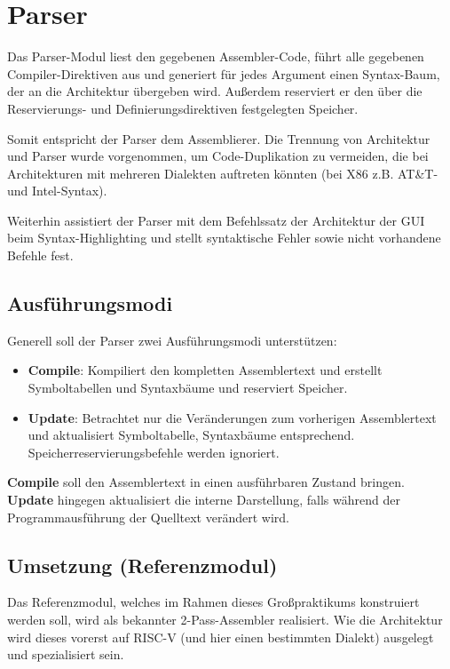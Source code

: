 \chapter{Parser}

Das Parser-Modul liest den gegebenen Assembler-Code, führt alle gegebenen
Compiler-Direktiven aus und generiert für jedes Argument einen Syntax-Baum, der
an die Architektur übergeben wird.  Außerdem reserviert er den über die
Reservierungs- und Definierungsdirektiven festgelegten Speicher.

Somit entspricht der Parser dem Assemblierer.  Die Trennung von Architektur und
Parser wurde vorgenommen, um Code-Duplikation zu vermeiden, die bei
Architekturen mit mehreren Dialekten auftreten könnten (bei X86 z.B. AT\&T- und
Intel-Syntax).

Weiterhin assistiert der Parser mit dem Befehlssatz der Architektur der GUI beim
Syntax-Highlighting und stellt syntaktische Fehler sowie nicht vorhandene Befehle fest.

\section{Ausführungsmodi}

Generell soll der Parser zwei Ausführungsmodi unterstützen:
\begin{itemize}
\item \textbf{Compile}: Kompiliert den kompletten Assemblertext und erstellt
  Symboltabellen und Syntaxbäume und reserviert Speicher.
\item \textbf{Update}: Betrachtet nur die Veränderungen zum vorherigen Assemblertext und aktualisiert Symboltabelle, Syntaxbäume entsprechend. Speicherreservierungsbefehle werden ignoriert.
\end{itemize}

\textbf{Compile} soll den Assemblertext in einen ausführbaren Zustand bringen. \textbf{Update} hingegen aktualisiert die interne Darstellung, falls während der Programmausführung der Quelltext verändert wird.

\section{Umsetzung (Referenzmodul)}

Das Referenzmodul, welches im Rahmen dieses Großpraktikums konstruiert werden
soll, wird als bekannter 2-Pass-Assembler realisiert. Wie die Architektur wird
dieses vorerst auf RISC-V (und hier einen bestimmten Dialekt) ausgelegt und
spezialisiert sein.

